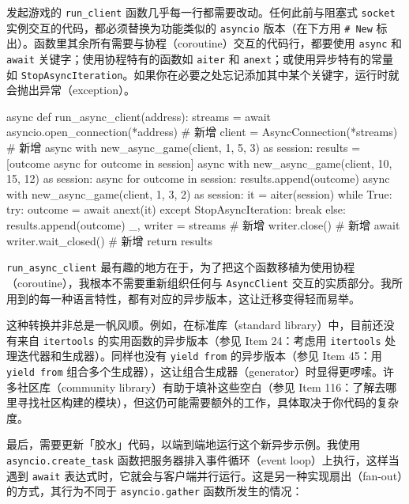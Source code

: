 发起游戏的 \texttt{run\_client} 函数几乎每一行都需要改动。任何此前与阻塞式 \texttt{socket} 实例交互的代码，都必须替换为功能类似的 \texttt{asyncio} 版本（在下方用 \texttt{\# New} 标出）。函数里其余所有需要与协程（coroutine）交互的代码行，都要使用 \texttt{async} 和 \texttt{await} 关键字；使用协程特有的函数如 \texttt{aiter} 和 \texttt{anext}；或使用异步特有的常量如 \texttt{StopAsyncIteration}。如果你在必要之处忘记添加其中某个关键字，运行时就会抛出异常（exception）。

\begin{codebox}[python]
async def run_async_client(address):
    streams = await asyncio.open_connection(*address)  # 新增
    client = AsyncConnection(*streams)                 # 新增
    async with new_async_game(client, 1, 5, 3) as session:
        results = [outcome async for outcome in session]
    async with new_async_game(client, 10, 15, 12) as session:
        async for outcome in session:
            results.append(outcome)
    async with new_async_game(client, 1, 3, 2) as session:
        it = aiter(session)
        while True:
            try:
                outcome = await anext(it)
            except StopAsyncIteration:
                break
            else:
                results.append(outcome)
    _, writer = streams                                # 新增
    writer.close()                                     # 新增
    await writer.wait_closed()                         # 新增
    return results
\end{codebox}

\texttt{run\_async\_client} 最有趣的地方在于，为了把这个函数移植为使用协程（coroutine），我根本不需要重新组织任何与 \texttt{AsyncClient} 交互的实质部分。我所用到的每一种语言特性，都有对应的异步版本，这让迁移变得轻而易举。

这种转换并非总是一帆风顺。例如，在标准库（standard library）中，目前还没有来自 \texttt{itertools} 的实用函数的异步版本（参见 Item 24：考虑用 \texttt{itertools} 处理迭代器和生成器）。同样也没有 \texttt{yield from} 的异步版本（参见 Item 45：用 \texttt{yield from} 组合多个生成器），这让组合生成器（generator）时显得更啰嗦。许多社区库（community library）有助于填补这些空白（参见 Item 116：了解去哪里寻找社区构建的模块），但这仍可能需要额外的工作，具体取决于你代码的复杂度。

最后，需要更新「胶水」代码，以端到端地运行这个新异步示例。我使用 \texttt{asyncio.create\_task} 函数把服务器排入事件循环（event loop）上执行，这样当遇到 \texttt{await} 表达式时，它就会与客户端并行运行。这是另一种实现扇出（fan-out）的方式，其行为不同于 \texttt{asyncio.gather} 函数所发生的情况：

